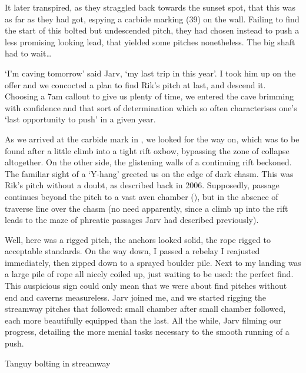 It later transpired, as they straggled back towards the sunset spot, that this was as far as they had got,  espying a carbide marking (39) on the wall. Failing to find the start of this bolted but undescended pitch, they had chosen instead to push a less promising looking lead, that yielded some pitches nonetheless. The big shaft had to wait…

`I'm caving tomorrow' said Jarv, `my last trip in  this year'. I took him up on the offer and we concocted a plan to find Rik's pitch at last, and descend it. Choosing a 7am callout to give us plenty of time, we entered the cave brimming with confidence and that sort of determination which so often characterises one's `last opportunity to push' in a given year. 

As we arrived at the carbide mark in , we looked for the way on, which was to be found after a little climb into a tight rift oxbow, bypassing the zone of collapse altogether. On the other side, the glistening walls of a continuing rift beckoned. The familiar sight of a `Y-hang' greeted us on the edge of dark chasm. This was Rik's pitch without a doubt, as described back in 2006. Supposedly,  passage continues beyond the pitch to a vast aven chamber (), but in the absence of traverse line over the chasm (no need apparently, since a climb up into the rift leads to the maze of phreatic passages Jarv had described previously).


Well, here was a rigged pitch, the anchors looked solid, the rope rigged to acceptable standards. On the way down, I passed a rebelay I reajusted immediately, then zipped down to a sprayed boulder pile. Next to my landing was a large pile of rope all nicely coiled up, just waiting to be used: the perfect find. This auspicious sign could only mean that we were about find pitches without end and caverns measureless. Jarv joined me, and we started rigging the streamway pitches that followed: small chamber after small chamber followed, each more beautifully equipped than the last. All the while, Jarv filming our progress, detailing the more menial tasks necessary to the smooth running of  a push.

\begin{marginfigure}
\centering
{}
\label{tanguybolting}
\caption{ Tanguy bolting in \protect{} streamway }
\end{marginfigure}

